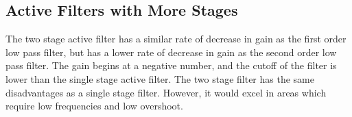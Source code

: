 \documentclass[10pt]{article}
\begin{document}
\subsection*{Active Filters with More Stages}
\noindent The two stage active filter has a similar rate of decrease in gain as the first order low pass filter, but has a lower rate of decrease in gain as the second order low pass filter. The gain begins at a negative number, and the cutoff of the filter is lower than the single stage active filter. The two stage filter has the same disadvantages as a single stage filter. However, it would excel in areas which require low frequencies and low overshoot.
\end{document}
